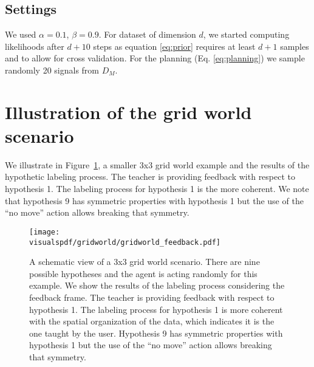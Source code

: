 \subsection{Settings}

We used $\alpha = 0.1$, $\beta = 0.9$. For dataset of dimension $d$, we started computing likelihoods after $d+10$ steps as equation \ref{eq:prior} requires at least $d+1$ samples and to allow for cross validation. For the planning (Eq. \ref{eq:planning}) we sample randomly 20 signals from $D_M$.

\section{Illustration of the grid world scenario}
\label{chapter:planning:gridworld}

We illustrate in Figure~\ref{fig:planning:gridworldfeedback}, a smaller 3x3 grid world example and the results of the hypothetic labeling process. The teacher is providing feedback with respect to hypothesis 1. The labeling process for hypothesis 1 is the more coherent. We note that hypothesis 9 has symmetric properties with hypothesis 1 but the use of the ``no move'' action allows breaking that symmetry.

\begin{figure}[!htbp]
  \centering
  \texttt{[image: \\visualspdf/gridworld/gridworld\_feedback.pdf]}
  \caption{A schematic view of a 3x3 grid world scenario. There are nine possible hypotheses and the agent is acting randomly for this example. We show the results of the labeling process considering the feedback frame. The teacher is providing feedback with respect to hypothesis 1. The labeling process for hypothesis 1 is more coherent with the spatial organization of the data, which indicates it is the one taught by the user. Hypothesis 9 has symmetric properties with hypothesis 1 but the use of the ``no move'' action allows breaking that symmetry.}
  \label{fig:planning:gridworldfeedback}
\end{figure}

\visuopti{\newpage}

